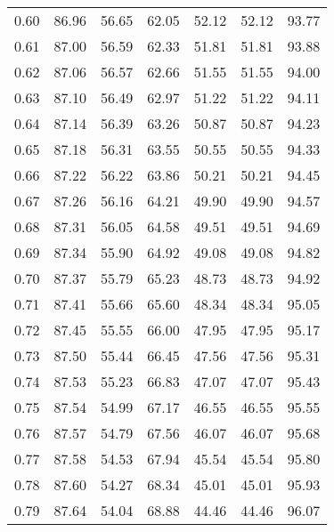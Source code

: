 \begin{tabular}{|c|c|c|c|c|c|c|}
      0.60 &     86.96 &     56.65 &      62.05 &   52.12 &      52.12 &         93.77 \\
      0.61 &     87.00 &     56.59 &      62.33 &   51.81 &      51.81 &         93.88 \\
      0.62 &     87.06 &     56.57 &      62.66 &   51.55 &      51.55 &         94.00 \\
      0.63 &     87.10 &     56.49 &      62.97 &   51.22 &      51.22 &         94.11 \\
      0.64 &     87.14 &     56.39 &      63.26 &   50.87 &      50.87 &         94.23 \\
      0.65 &     87.18 &     56.31 &      63.55 &   50.55 &      50.55 &         94.33 \\
      0.66 &     87.22 &     56.22 &      63.86 &   50.21 &      50.21 &         94.45 \\
      0.67 &     87.26 &     56.16 &      64.21 &   49.90 &      49.90 &         94.57 \\
      0.68 &     87.31 &     56.05 &      64.58 &   49.51 &      49.51 &         94.69 \\
      0.69 &     87.34 &     55.90 &      64.92 &   49.08 &      49.08 &         94.82 \\
      0.70 &     87.37 &     55.79 &      65.23 &   48.73 &      48.73 &         94.92 \\
      0.71 &     87.41 &     55.66 &      65.60 &   48.34 &      48.34 &         95.05 \\
      0.72 &     87.45 &     55.55 &      66.00 &   47.95 &      47.95 &         95.17 \\
      0.73 &     87.50 &     55.44 &      66.45 &   47.56 &      47.56 &         95.31 \\
      0.74 &     87.53 &     55.23 &      66.83 &   47.07 &      47.07 &         95.43 \\
      0.75 &     87.54 &     54.99 &      67.17 &   46.55 &      46.55 &         95.55 \\
      0.76 &     87.57 &     54.79 &      67.56 &   46.07 &      46.07 &         95.68 \\
      0.77 &     87.58 &     54.53 &      67.94 &   45.54 &      45.54 &         95.80 \\
      0.78 &     87.60 &     54.27 &      68.34 &   45.01 &      45.01 &         95.93 \\
      0.79 &     87.64 &     54.04 &      68.88 &   44.46 &      44.46 &         96.07 \\

\end{tabular}
